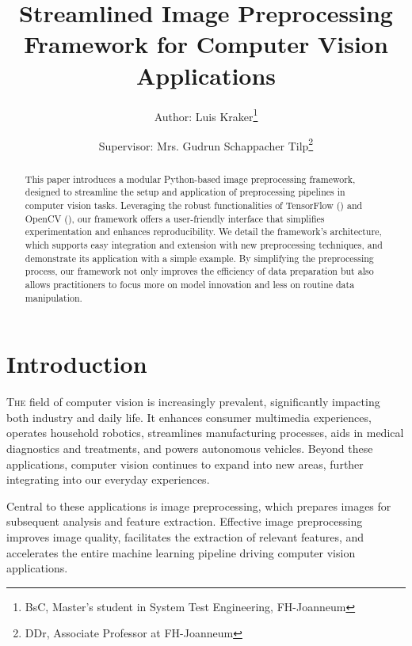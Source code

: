 \documentclass[journal]{new-aiaa}
\title{Streamlined Image Preprocessing Framework for Computer Vision Applications %
}
\author{Author: Luis Kraker\footnote{BsC, Master's student in System Test Engineering, FH-Joanneum}}
\affil{FH-Joanneum, Graz 8020, Austria}
\author{Supervisor: Mrs. Gudrun Schappacher Tilp\footnote{DDr, Associate Professor at FH-Joanneum}}
\affil{FH-Joanneum, Graz 8020, Austria}
\begin{document}
\maketitle

\begin{abstract}
This paper introduces a modular Python-based image preprocessing framework, designed to streamline the setup and application of preprocessing pipelines in computer vision tasks. Leveraging the robust functionalities of TensorFlow (\cite{tensorflow2015}) and OpenCV (\cite{opencv2000}), our framework offers a user-friendly interface that simplifies experimentation and enhances reproducibility. We detail the framework's architecture, which supports easy integration and extension with new preprocessing techniques, and demonstrate its application with a simple example. By simplifying the preprocessing process, our framework not only improves the efficiency of data preparation but also allows practitioners to focus more on model innovation and less on routine data manipulation.
\end{abstract}


\section{Introduction}
\lettrine{T}{he} field of computer vision is increasingly prevalent, significantly impacting both industry and daily life. It enhances consumer multimedia experiences, operates household robotics, streamlines manufacturing processes, aids in medical diagnostics and treatments, and powers autonomous vehicles.\cite{bebis2002review} Beyond these applications, computer vision continues to expand into new areas, further integrating into our everyday experiences.\cite{szeliski2010computer}


Central to these applications is image preprocessing, which prepares images for subsequent analysis and feature extraction.\cite{gonzalez2002digital} Effective image preprocessing improves image quality, facilitates the extraction of relevant features, and accelerates the entire machine learning pipeline driving computer vision applications.\cite{nelson2020image}\cite{krig2014image}
\end{document}
